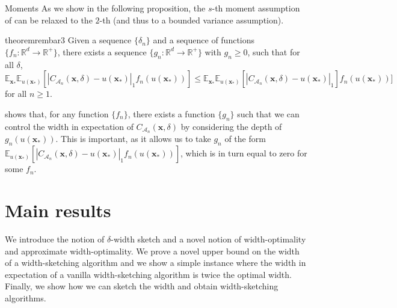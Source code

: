 \begin{assumptioni}[i.i.d data]
\begin{assumptioni}
\begin{assumptioni}{Moments}
As we show in the following proposition, the $s$-th moment assumption of  can be relaxed to the $2$-th (and thus to a bounded variance assumption).
\begin{restatable}{theorem}{rembar3}\label{prop:rem3}
  Given a sequence $\{\delta_n\}$ and a sequence of functions $\{f_n: \mathbb{R}^d \rightarrow \mathbb{R}^+\}$, there exists a sequence $\{g_n: \mathbb{R}^d \rightarrow \mathbb{R}^+\}$ with $g_n \geq 0$, such that for all $\delta$,
  \begin{equation}
    \mathbb{E}_{\bm{x}_*} \mathbb{E}_{u(\bm{x_*})}[|C_{\mathcal{A}_n}(\bm{x},\delta) - u(\bm{x_*})|_1 f_n(u(\bm{x_*}))] \leq \mathbb{E}_{\bm{x}_*} \mathbb{E}_{u(\bm{x_*})}[|C_{\mathcal{A}_n}(\bm{x},\delta) - u(\bm{x_*})|_1] f_n(u(\bm{x_*}))] 
  \end{equation} 
  for all $n \geq 1$. 
\end{restatable}
\begin{remark}
   shows that, for any function $\{f_n\}$, there exists a function $\{g_n\}$ such that we can control the width in expectation of $C_{\mathcal{A}_n}(\bm{x},\delta)$ by considering the depth of $g_n(u(\bm{x}_*))$. This is important, as it allows us to take $g_n$ of the form $\mathbb{E}_{u(\bm{x}_*)}[|C_{\mathcal{A}_n}(\bm{x},\delta) - u(\bm{x_*})|_1 f_n(u(\bm{x_*}))]$, which is in turn equal to zero for some $f_n$. 
\end{remark}



\section{Main results}


We introduce the notion of $\delta$-width sketch and a novel notion of width-optimality and approximate width-optimality. We prove a novel upper bound on the width of a width-sketching algorithm and we show a simple instance where the width in expectation of a vanilla width-sketching algorithm is twice the optimal width. Finally, we show how we can sketch the width and obtain width-sketching algorithms.


\end{assumptioni}
\end{assumptioni}
\end{assumptioni}
